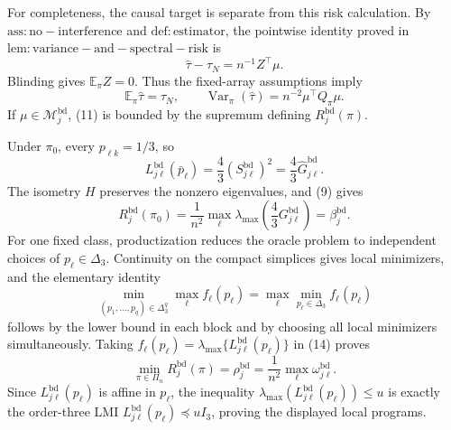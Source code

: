For completeness, the causal target is separate from this risk calculation.  By \(\mathrm{ass:no-interference}\) and \(\mathrm{def:estimator}\), the pointwise identity proved in \(\mathrm{lem:variance-and-spectral-risk}\) is
\[
\widehat\tau-\tau_N=n^{-1}Z^\top\mu. \tag{10}
\]
Blinding gives \(\mathbb E_\pi Z=0\).  Thus the fixed-array assumptions imply
\[
\mathbb E_\pi\widehat\tau=\tau_N,
\qquad
\operatorname{Var}_\pi(\widehat\tau)=n^{-2}\mu^\top Q_\pi\mu. \tag{11}
\]
If \(\mu\in\mathcal M_j^{\mathrm{bd}}\), (11) is bounded by the supremum defining \(R_j^{\mathrm{bd}}(\pi)\).

Under \(\pi_0\), every \(p_{\ell k}=1/3\), so
\[
L_{j\ell}^{\mathrm{bd}}(\bar p_\ell)
=\frac43(S_{j\ell}^{\mathrm{bd}})^2
=\frac43\widehat G_{j\ell}^{\mathrm{bd}}. \tag{12}
\]
The isometry \(H\) preserves the nonzero eigenvalues, and (9) gives
\[
R_j^{\mathrm{bd}}(\pi_0)
=\frac1{n^2}\max_\ell
\lambda_{\max}\!\left(\frac43G_{j\ell}^{\mathrm{bd}}\right)
=\beta_j^{\mathrm{bd}}. \tag{13}
\]
For one fixed class, productization reduces the oracle problem to independent choices of \(p_\ell\in\Delta_3\).  Continuity on the compact simplices gives local minimizers, and the elementary identity
\[
\min_{(p_1,\ldots,p_q)\in\Delta_3^q}
\max_\ell f_\ell(p_\ell)
=\max_\ell\min_{p_\ell\in\Delta_3}f_\ell(p_\ell) \tag{14}
\]
follows by the lower bound in each block and by choosing all local minimizers simultaneously.  Taking
\(f_\ell(p_\ell)=\lambda_{\max}\{L_{j\ell}^{\mathrm{bd}}(p_\ell)\}\) in (14) proves
\[
\min_{\pi\in\Pi_n}R_j^{\mathrm{bd}}(\pi)
=\rho_j^{\mathrm{bd}}
=\frac1{n^2}\max_\ell\omega_{j\ell}^{\mathrm{bd}}. \tag{15}
\]
Since \(L_{j\ell}^{\mathrm{bd}}(p_\ell)\) is affine in \(p_\ell\), the inequality
\(\lambda_{\max}(L_{j\ell}^{\mathrm{bd}}(p_\ell))\le u\) is exactly the order-three LMI
\(L_{j\ell}^{\mathrm{bd}}(p_\ell)\preceq uI_3\), proving the displayed local programs.

